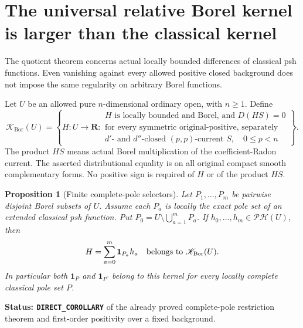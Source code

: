 \documentclass[11pt,a4paper]{article}
\numberwithin{equation}{section}
\newtheorem{proposition}[theorem]{Proposition}
\theoremstyle{definition}
\theoremstyle{remark}
\begin{document}


\section{The universal relative Borel kernel is larger than the classical kernel}
\label{sec:r5-universal-borel-kernel}

The quotient theorem concerns actual locally bounded differences of
classical psh functions.  Even vanishing against every allowed positive
closed background does not impose the same regularity on arbitrary
Borel functions.

Let $U$ be an allowed pure $n$-dimensional ordinary open, with
$n\geq1$.  Define
\[
 \mathscr K_{\mathrm{Bor}}(U)=
 \left\{H:U\to\mathbf R:\begin{array}{l}
 H\text{ is locally bounded and Borel, and }D(HS)=0\\
 \text{for every symmetric original-positive, separately}\\
 d'\text{- and }d''\text{-closed }(p,p)\text{-current }S,\quad
 0\leq p<n
 \end{array}\right\}.
\]
The product $HS$ means actual Borel multiplication of the
coefficient-Radon current.  The asserted distributional equality is on
all original compact smooth complementary forms.  No positive sign is
required of $H$ or of the product $HS$.

\begin{proposition}[Finite complete-pole selectors]
\label{prop:r5-universal-pole-selectors}
Let $P_1,\ldots,P_m$ be pairwise disjoint Borel subsets of $U$.
Assume each $P_a$ is locally the exact pole set of an extended
classical psh function.  Put
$P_0=U\setminus\bigcup_{a=1}^mP_a$.
If $h_0,\ldots,h_m\in\mathscr{PH}(U)$, then
\[
                 H=\sum_{a=0}^m\mathbf1_{P_a}h_a
                       \quad\hbox{belongs to }\mathscr K_{\mathrm{Bor}}(U).
\]
In particular both $\mathbf1_P$ and $\mathbf1_{P^c}$ belong to
this kernel for every locally complete classical pole set $P$.
\end{proposition}

\noindent\textbf{Status: \texttt{DIRECT\_COROLLARY}} of the
already proved complete-pole restriction theorem and first-order
positivity over a fixed background.
\end{document}
